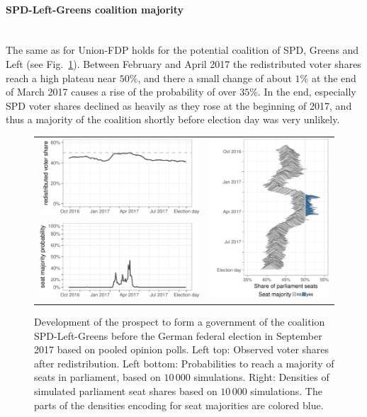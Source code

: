 \documentclass[smallcondensed]{svjour3}     %
\begin{document}
\paragraph{SPD-Left-Greens coalition majority} \ \\
The same as for Union-FDP holds for the potential coalition of
SPD, Greens and Left (see Fig.~\ref{fig:2017_spdleftgreens}).
Between February and April 2017 the redistributed voter
shares reach a high plateau near $50\%$, and there a small change
of about $1\%$ at the end of March 2017 causes a rise of
the probability of over $35\%$.
In the end, especially SPD voter shares declined as heavily as
they rose at the beginning of 2017, and thus a majority of
the coalition shortly before election day was very unlikely.

\begin{figure}[H]\centering
\begin{tabular}{ll}
\includegraphics[height=.15\textwidth]{figures/2017_pooled_spdleftgreens_rawSharesRedist.pdf}
&
\multirow{2}{*}[13ex]{\includegraphics[height=30ex]{figures/2017_pooled_spdleftgreens_ridgeline.pdf}}
\\
\includegraphics[height=.15\textwidth]{figures/2017_pooled_spdleftgreens_prob.pdf}
\end{tabular}
\caption{Development of the prospect to form a government of the coalition SPD-Left-Greens before the German federal election in September 2017 based on pooled opinion polls.
Left top: Observed voter shares after redistribution. Left bottom: Probabilities to reach a majority of seats in parliament, based on $10\,000$ simulations. Right: Densities of simulated parliament seat shares based on $10\,000$ simulations. The parts of the densities encoding for seat majorities are colored blue.
\label{fig:2017_spdleftgreens}
}
\end{figure}
\end{document}
